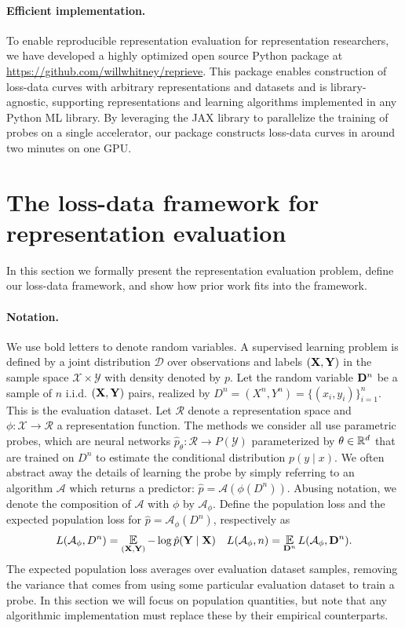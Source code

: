 \paragraph{Efficient implementation.} To enable reproducible representation evaluation for representation researchers, we have developed a highly optimized open source Python package
at \url{https://github.com/willwhitney/reprieve}.
This package enables construction of loss-data curves with arbitrary representations and datasets and is library-agnostic, supporting representations and learning algorithms implemented in any Python ML library.
By leveraging the JAX library \citep{jax2018github} to parallelize the training of probes on a single accelerator, our package constructs loss-data curves in around two minutes on one GPU.



\section{The loss-data framework for representation evaluation}

In this section we formally present the representation evaluation problem, define our loss-data framework, and show how prior work fits into the framework.


\paragraph{Notation.}
We use bold letters to denote random variables.
A supervised learning problem is defined by a joint distribution $ \mathcal{D}$ over
observations and labels $({\mathbf{X}}, {\mathbf{Y}})$ in the sample space $ \mathcal{X} \times \mathcal{Y}$ with density denoted by $ p$.
Let the random variable ${\mathbf{D}}^n$ be a sample of $n$ i.i.d. $({\mathbf{X}}, {\mathbf{Y}})$ pairs, realized by $D^n = (X^n, Y^n) = \{(x_i, y_i)\}_{i=1}^n$.
This is the evaluation dataset.
Let $ \mathcal{R}$ denote a representation space and $\phi: \mathcal{X} \to \mathcal{R}$ a representation function.
The methods we consider all use parametric probes, which are neural networks $\hat{p}_\theta: \mathcal{R} \to P(\mathcal{Y})$ parameterized by $ \theta\in \mathbb{R}^d$ that are trained on $D^n$ to estimate the conditional distribution $p(y \mid x)$.
We often abstract away the details of learning the probe by simply referring to an algorithm $\mathcal{A}$ which returns a predictor: $\hat{p} = \mathcal{A}(\phi(D^n))$. Abusing notation, we denote the composition of $ \mathcal{A}$ with $\phi$ by $\mathcal{A}_\phi$.
Define the population loss and the expected population loss for $\hat{p} = \mathcal{A}_\phi(D^n)$, respectively as
\begin{align}
    L(\mathcal{A}_\phi, D^n) = \E_{(\rmX, \rmY)} - \log \hat{p}(\rmY \mid \rmX) \label{eq:loss_data} && L(\mathcal{A}_\phi, n) = \E_{\rmD^n} L(\mathcal{A}_\phi, \rmD^n). %
\end{align}
The expected population loss averages over evaluation dataset samples, removing the variance that comes from using some particular evaluation dataset to train a probe.
In this section we will focus on population quantities, but note that any algorithmic implementation must replace these by their empirical counterparts.


